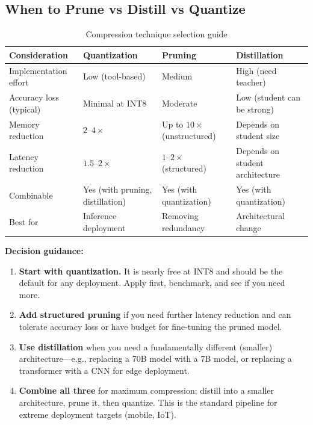 \subsection{When to Prune vs Distill vs Quantize}

\begin{table}[H]
\centering
\caption{Compression technique selection guide}
\begin{tabularx}{\textwidth}{lXXX}
\toprule
\textbf{Consideration} & \textbf{Quantization} & \textbf{Pruning} & \textbf{Distillation} \\
\midrule
Implementation effort & Low (tool-based) & Medium & High (need teacher) \\
Accuracy loss (typical) & Minimal at INT8 & Moderate & Low (student can be strong) \\
Memory reduction & $2$--$4\times$ & Up to $10\times$ (unstructured) & Depends on student size \\
Latency reduction & $1.5$--$2\times$ & $1$--$2\times$ (structured) & Depends on student architecture \\
Combinable & Yes (with pruning, distillation) & Yes (with quantization) & Yes (with quantization) \\
Best for & Inference deployment & Removing redundancy & Architectural change \\
\bottomrule
\end{tabularx}
\end{table}

\textbf{Decision guidance:}
\begin{enumerate}
    \item \textbf{Start with quantization.} It is nearly free at INT8 and should be the default for any deployment. Apply first, benchmark, and see if you need more.
    \item \textbf{Add structured pruning} if you need further latency reduction and can tolerate accuracy loss or have budget for fine-tuning the pruned model.
    \item \textbf{Use distillation} when you need a fundamentally different (smaller) architecture---e.g., replacing a 70B model with a 7B model, or replacing a transformer with a CNN for edge deployment.
    \item \textbf{Combine all three} for maximum compression: distill into a smaller architecture, prune it, then quantize. This is the standard pipeline for extreme deployment targets (mobile, IoT).
\end{enumerate}

